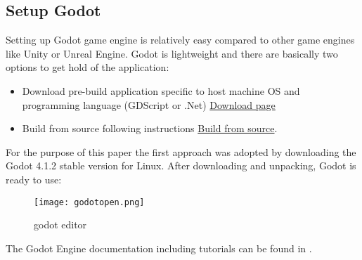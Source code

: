 \subsection{Setup Godot}
Setting up Godot game engine is relatively easy compared to other game engines like Unity\textsuperscript{\texttrademark}
or Unreal Engine\textsuperscript{\texttrademark}. Godot is lightweight and there are basically two options to get hold
of the application:
\begin{itemize}
    \item Download pre-build application specific to host machine OS and programming language (GDScript or .Net)
    \href{https://godotengine.org/download/linux/}{\color{blue}Download page}
    \item Build from source following instructions 
    \href{https://docs.godotengine.org/en/stable/contributing/development/compiling/index.html}{\color{blue}Build from source}.
\end{itemize}
For the purpose of this paper the first approach was adopted by downloading the Godot 4.1.2 stable version for Linux.
After downloading and unpacking, Godot is ready to use:
\begin{figure}[H]
    \centering
    \texttt{[image: godotopen.png]}
      \caption{godot editor}
      \label{fig:godot}
\end{figure}
The Godot Engine documentation including tutorials can be found in \cite{godot}.
